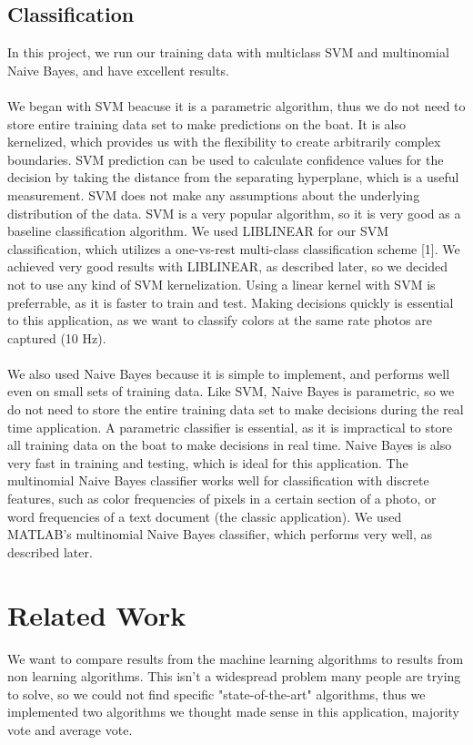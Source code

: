 \documentclass{article} %
\begin{document}
\subsection{Classification}
In this project, we run our training data with multiclass SVM and multinomial Naive Bayes, and have excellent results. \\\\
We began with SVM beacuse it is a parametric algorithm, thus we do not need to store entire 
training data set to make predictions on the boat. It is also kernelized, which provides us with the flexibility to
create arbitrarily complex boundaries. SVM prediction can be used to calculate confidence values for the
decision by taking the distance from the separating hyperplane, which is a useful measurement. SVM does not make any
assumptions about the underlying distribution of the data. SVM is a very popular algorithm, so it is very good as a baseline
classification algorithm. We used LIBLINEAR for our SVM classification, which utilizes a one-vs-rest multi-class classification
scheme [1]. We achieved very good results with LIBLINEAR, as described later, so we decided not to use any kind of SVM 
kernelization. Using a linear kernel with SVM is preferrable, as it is faster to train and test. Making decisions quickly
is essential to this application, as we want to classify colors at the same rate photos are captured (10 Hz).\\\\
We also used Naive Bayes because it is simple to implement, and performs well even on small sets of training data. Like
SVM, Naive Bayes is parametric, so we do not need to store the entire training data set to make decisions during the
real time application. A parametric classifier is essential, as it is impractical to store all training data on the boat
to make decisions in real time. Naive Bayes is also very fast in training and testing, which is ideal for this application.
The multinomial Naive Bayes classifier works well for classification with discrete features, such as color frequencies of pixels
in a certain section of a photo, or word frequencies of a text document (the classic application). We used MATLAB's multinomial 
Naive Bayes classifier, which performs very well, as described later.

\section{Related Work}
We want to compare results from the machine learning algorithms to results from non learning algorithms. This isn't a widespread problem many people are trying to solve, so we could not find specific "state-of-the-art" algorithms, thus we implemented two algorithms we thought made sense in this application, majority vote and average vote.
\end{document}
